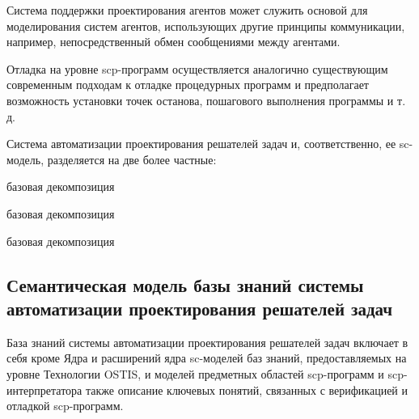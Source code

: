 Система поддержки проектирования агентов может служить основой для моделирования систем агентов, использующих другие принципы коммуникации, например, непосредственный обмен сообщениями между агентами.

Отладка на уровне scp-программ осуществляется аналогично существующим современным подходам к отладке процедурных программ и предполагает возможность установки точек останова, пошагового выполнения программы и т. д.

Система автоматизации проектирования решателей задач и, соответственно, ее sc-модель, разделяется на две более частные:

\begin{SCn}

\begin{scnreltoset}{базовая декомпозиция}
\begin{scnindent}
    \begin{scnreltoset}{базовая декомпозиция}
    \end{scnreltoset}
\end{scnindent}
\begin{scnindent}
    \begin{scnreltoset}{базовая декомпозиция}
    \end{scnreltoset}
\end{scnindent}
\end{scnreltoset}
\end{SCn}

\subsection{Семантическая модель базы знаний системы автоматизации проектирования решателей задач}

База знаний системы автоматизации проектирования решателей задач включает в себя кроме Ядра и расширений ядра sc-моделей баз знаний, предоставляемых на уровне Технологии OSTIS, и моделей предметных областей scp-программ и scp-интерпретатора также описание ключевых понятий, связанных с верификацией и отладкой scp-программ.

